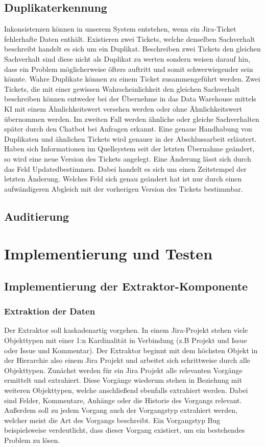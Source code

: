 \documentclass[10pt]{article}
\begin{document}
\subsection{Duplikaterkennung}
Inkonsistenzen können in unserem System entstehen, wenn ein Jira-Ticket fehlerhafte Daten enthält. Existieren zwei Tickets, welche denselben Sachverhalt beschreibt handelt es sich um ein Duplikat. Beschreiben zwei Tickets den gleichen Sachverhalt sind diese nicht als Duplikat zu werten sondern weisen darauf hin, dass ein Problem möglicherweise öfters auftritt und somit schwerwiegender sein könnte. Wahre Duplikate können zu einem Ticket zusammengeführt werden. Zwei Tickets, die mit einer gewissen Wahrscheinlichkeit den gleichen Sachverhalt beschreiben können entweder bei der Übernehme in das Data Warehouse mittels KI mit einem Ähnlichkeitswert versehen werden oder ohne Ähnlichkeitswert übernommen werden. Im zweiten Fall werden ähnliche oder gleiche Sachverhalten später durch den Chatbot bei Anfragen erkannt. Eine genaue Handhabung von Duplikaten und ähnlichen Tickets wird genauer in der Abschlussarbeit erläutert.\\
Haben sich Informationen im Quellsystem seit der letzten Übernahme geändert, so wird eine neue Version des Tickets angelegt. Eine Änderung lässt sich durch das Feld \glqq Updated\grqq\:bestimmen. Dabei handelt es sich um einen Zeitstempel der letzten Änderung. Welches Feld sich genau geändert hat ist nur durch einen aufwändigeren Abgleich mit der vorherigen Version des Tickets bestimmbar.
\subsection{Auditierung}
\section{Implementierung und Testen}
\subsection{Implementierung der Extraktor-Komponente}
\subsubsection{Extraktion der Daten}
Der Extraktor soll kaskadenartig vorgehen. In einem Jira-Projekt stehen viele Objekttypen mit einer 1:n Kardinalität in Verbindung (z.B Projekt und Issue oder Issue und Kommentar). Der Extraktor beginnt mit dem höchsten Objekt in der Hierarchie also einem Jira Projekt und arbeitet sich schrittweise durch alle Objekttypen. Zunächst werden für ein Jira Projekt alle relevanten Vorgänge ermittelt und extrahiert. Diese Vorgänge wiederum stehen in Beziehung mit weiteren Objekttypen, welche anschließend ebenfalls extrahiert werden. Dabei sind Felder, Kommentare, Anhänge oder die Historie des Vorgangs relevant. Außerdem soll zu jedem Vorgang auch der Vorgangstyp extrahiert werden, welcher meist die Art des Vorgangs beschreibt. Ein Vorgangstyp Bug beispielsweise verdeutlicht, dass dieser Vorgang existiert, um ein bestehendes Problem zu lösen.
\end{document}
